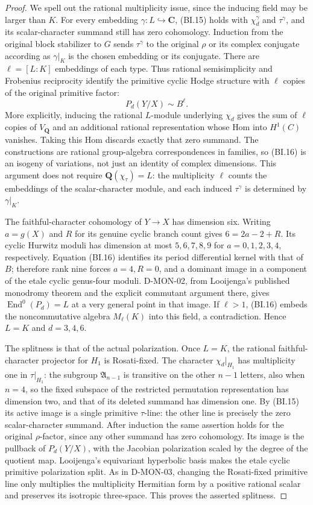 \begin{proof}
We spell out the rational multiplicity issue, since the inducing
field may be larger than $K$.  For every embedding
$\gamma:L\hookrightarrow\mathbf C$, (BI.15) holds with
$\chi_d^\gamma$ and $\tau^\gamma$, and its scalar-character
summand still has zero cohomology.  Induction from the original
block stabilizer to $G$ sends $\tau^\gamma$ to the original
$\rho$ or its complex conjugate according as $\gamma|_K$ is the
chosen embedding or its conjugate.  There are $\ell=[L:K]$
embeddings of each type.  Thus rational semisimplicity and
Frobenius reciprocity identify the primitive cyclic Hodge structure
with $\ell$ copies of the original primitive factor:
\[
                     P_d(Y/X)\sim B^{\ell}.
\tag{BI.16}
\]
More explicitly, inducing the rational $L$-module underlying
$\chi_d$ gives the sum of $\ell$ copies of $V_{\mathbf Q}$ and
an additional rational representation whose Hom into $H^1(C)$
vanishes.  Taking this Hom discards exactly that zero summand.
The constructions are rational group-algebra correspondences in
families, so (BI.16) is an isogeny of variations, not just an
identity of complex dimensions.
This argument does not require $\mathbf Q(\chi_\tau)=L$:
the multiplicity $\ell$ counts the embeddings of the scalar-character
module, and each induced $\tau^\gamma$ is determined by $\gamma|_K$.

The faithful-character cohomology of $Y\to X$ has dimension six.
Writing $a=g(X)$ and $R$ for its genuine cyclic branch count gives
$6=2a-2+R$.  Its cyclic Hurwitz moduli has dimension at most
$5,6,7,8,9$ for $a=0,1,2,3,4$, respectively.  Equation (BI.16)
identifies its period differential kernel with that of $B$;
therefore rank nine forces $a=4,R=0$, and a dominant image in a
component of the etale cyclic genus-four moduli.  D-MON-02, from
Looijenga's published monodromy theorem and the explicit commutant
argument there, gives $\operatorname{End}^0(P_d)=L$ at a very
general point in that image.  If $\ell>1$, (BI.16) embeds the
noncommutative algebra $M_\ell(K)$ into this field, a contradiction.
Hence $L=K$ and $d=3,4,6$.

The splitness is that of the actual polarization.  Once $L=K$,
the rational faithful-character projector for $H_1$ is
Rosati-fixed.  The character $\chi_d|_{H_1}$ has multiplicity one
in $\tau|_{H_1}$: the subgroup $\mathfrak A_{n-1}$ is transitive
on the other $n-1$ letters, also when $n=4$, so the fixed subspace
of the restricted permutation representation has dimension two,
and that of its deleted summand has dimension one.
By (BI.15) its active image is a single primitive
$\tau$-line: the other line is precisely the zero scalar-character
summand.  After induction the same assertion holds for the original
$\rho$-factor, since any other summand has zero cohomology.
Its image is the pullback of $P_d(Y/X)$, with the Jacobian
polarization scaled by the degree of the quotient map.  Looijenga's
equivariant hyperbolic basis makes the etale cyclic primitive
polarization split.  As in D-MON-03, changing the Rosati-fixed
primitive line only multiplies the multiplicity Hermitian form
by a positive rational scalar and preserves its isotropic
three-space.  This proves the asserted splitness.
\end{proof}

